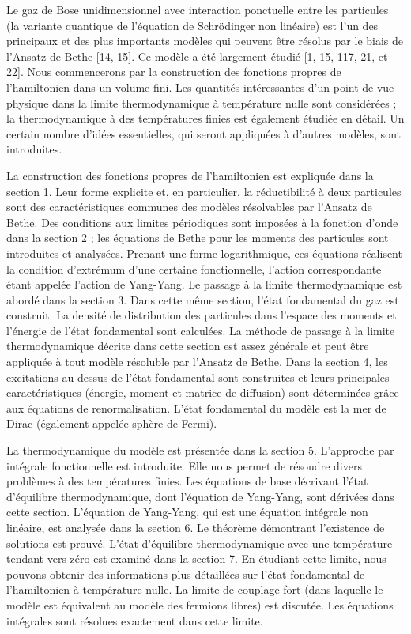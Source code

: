 Le gaz de Bose unidimensionnel avec interaction ponctuelle entre les particules (la variante quantique de l'équation de Schrödinger non linéaire) est l'un des principaux et des plus importants modèles qui peuvent être résolus par le biais de l'Ansatz de Bethe [14, 15]. Ce modèle a été largement étudié [1, 15, 117, 21, et 22]. Nous commencerons par la construction des fonctions propres de l'hamiltonien dans un volume fini. Les quantités intéressantes d'un point de vue physique dans la limite thermodynamique à température nulle sont considérées ; la thermodynamique à des températures finies est également étudiée en détail. Un certain nombre d'idées essentielles, qui seront appliquées à d'autres modèles, sont introduites.

La construction des fonctions propres de l'hamiltonien est expliquée dans la section 1. Leur forme explicite et, en particulier, la réductibilité à deux particules sont des caractéristiques communes des modèles résolvables par l'Ansatz de Bethe. Des conditions aux limites périodiques sont imposées à la fonction d'onde dans la section 2 ; les équations de Bethe pour les moments des particules sont introduites et analysées. Prenant une forme logarithmique, ces équations réalisent la condition d'extrémum d'une certaine fonctionnelle, l'action correspondante étant appelée l'action de Yang-Yang. Le passage à la limite thermodynamique est abordé dans la section 3. Dans cette même section, l'état fondamental du gaz est construit. La densité de distribution des particules dans l'espace des moments et l'énergie de l'état fondamental sont calculées. La méthode de passage à la limite thermodynamique décrite dans cette section est assez générale et peut être appliquée à tout modèle résoluble par l'Ansatz de Bethe. Dans la section 4, les excitations au-dessus de l'état fondamental sont construites et leurs principales caractéristiques (énergie, moment et matrice de diffusion) sont déterminées grâce aux équations de renormalisation. L'état fondamental du modèle est la mer de Dirac (également appelée sphère de Fermi).

La thermodynamique du modèle est présentée dans la section 5. L'approche par intégrale fonctionnelle est introduite. Elle nous permet de résoudre divers problèmes à des températures finies. Les équations de base décrivant l'état d'équilibre thermodynamique, dont l'équation de Yang-Yang, sont dérivées dans cette section. L'équation de Yang-Yang, qui est une équation intégrale non linéaire, est analysée dans la section 6. Le théorème démontrant l'existence de solutions est prouvé. L'état d'équilibre thermodynamique avec une température tendant vers zéro est examiné dans la section 7. En étudiant cette limite, nous pouvons obtenir des informations plus détaillées sur l'état fondamental de l'hamiltonien à température nulle. La limite de couplage fort (dans laquelle le modèle est équivalent au modèle des fermions libres) est discutée. Les équations intégrales sont résolues exactement dans cette limite.


